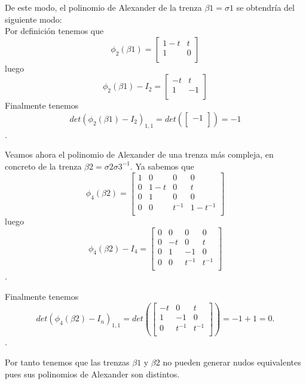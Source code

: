 De este modo, el polinomio de Alexander de la trenza $\beta1 = \sigma1$ se obtendría del siguiente modo:\\
Por definición tenemos que  
\[ \phi_{2} (\beta1) = \begin{bmatrix}
1-t & t  \\
1 & 0 \\
\end{bmatrix}\]
luego 
\[ \phi_{2} (\beta1) - I_{2}= \begin{bmatrix}
-t & t  \\
1 & -1 \\
\end{bmatrix}\]
Finalmente tenemos 
\[ det(\phi_{2} (\beta1) - I_{2})_{1,1} = det(\begin{bmatrix}
-1 \\
\end{bmatrix}) = -1\].

Veamos ahora el polinomio de Alexander de una trenza más compleja, en concreto de la trenza $\beta2 = \sigma2\sigma3^{-1}$. Ya sabemos que 
 \[ \phi_{4} (\beta2) = \begin{bmatrix}
 1 & 0 & 0 & 0 \\
 0 & 1-t & 0 & t \\
 0 & 1 & 0 & 0  \\	
 0 & 0 & t^{-1} & 1-t^{-1} \\
 \end{bmatrix}\]
 luego
  \[ \phi_{4} (\beta2) - I_{4} = \begin{bmatrix}
  0 & 0 & 0 & 0 \\
  0 & -t & 0 & t \\
  0 & 1 & -1 & 0  \\	
  0 & 0 & t^{-1} & t^{-1} \\
  \end{bmatrix}\].
  
  Finalmente tenemos 
    \[ det(\phi_{4} (\beta2) - I_{n})_{1,1} = det(\begin{bmatrix}
    -t & 0 & t \\
     1 & -1 & 0  \\	
     0 & t^{-1} & t^{-1} \\
    \end{bmatrix}) = -1+1 = 0.\].
    
Por tanto tenemos que las trenzas $\beta1$ y $\beta2$ no pueden generar nudos equivalentes pues sus polinomios de Alexander son distintos.\\
    
